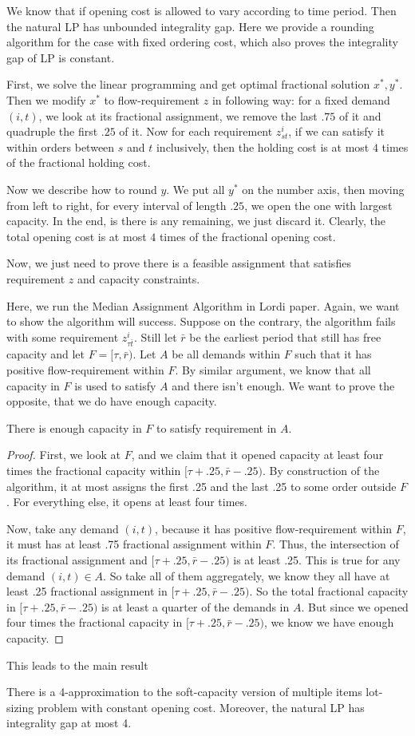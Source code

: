 We know that if opening cost is allowed to vary according
to time period. Then the natural LP has unbounded integrality
gap. Here we provide a rounding algorithm for the case
with fixed ordering cost, which also proves the integrality
gap of LP is constant.

First, we solve the linear programming and get optimal
fractional solution $x^*, y^*$. Then we modify $x^*$
to flow-requirement $z$ in following way:
for a fixed demand $(i,t)$, we look at its fractional
assignment, we remove the last $.75$ of it and quadruple
the first $.25$ of it. Now for each requirement $z_{st}^i$,
if we can satisfy it within orders between $s$ and $t$
inclusively, then the holding cost is at most $4$ times
of the fractional holding cost.

Now we describe how to round $y$. We put all $y^*$ on the number
axis, then moving from left to right, for every interval of
length $.25$, we open the one with largest capacity. In the end,
is there is any remaining, we just discard it. Clearly,
the total opening cost is at most $4$ times of the fractional
opening cost.

Now, we just need to prove there is a feasible assignment
that satisfies requirement $z$ and capacity constraints.

Here, we run the Median Assignment Algorithm in Lordi paper.
Again, we want to show the algorithm will success. Suppose
on the contrary, the algorithm fails with some requirement
$z^i_{\tau\bar t}$. Still let $\bar r$ be the earliest period that
still has free capacity and let $F = [\tau, \bar r)$. Let $A$
be all demands within $F$ such that it has positive flow-requirement
within $F$. By similar argument, we know that all capacity
in $F$ is used to satisfy $A$ and there isn't enough. We
want to prove the opposite, that we do have enough capacity.

\begin{claim}
There is enough capacity in $F$ to satisfy requirement in $A$.
\end{claim}

\begin{proof}
First, we look at $F$, and we claim that it opened capacity
at least four times the fractional capacity within $[\tau+.25,\bar r-.25)$.
By construction of the algorithm, it at most assigns the first .25 and the
last .25 to some order outside $F$. For everything else, it opens
at least four times.

Now, take any demand $(i,t)$, because it has positive
flow-requirement within $F$, it must has at least .75 fractional
assignment within $F$. Thus, the intersection of its fractional
assignment and $[\tau+.25,\bar r-.25)$ is at least .25. This
is true for any demand $(i,t) \in A$. So take all of them aggregately,
we know they all have at least .25 fractional assignment in $[\tau+.25,\bar r-.25)$.
So the total fractional capacity in $[\tau+.25,\bar r-.25)$ is at least a quarter
of the demands in $A$. But since we opened four times the fractional capacity
in $[\tau+.25,\bar r-.25)$, we know we have enough capacity.
\end{proof}

This leads to the main result

\begin{thm}
There is a 4-approximation to the soft-capacity version of multiple items lot-sizing
problem with constant opening cost. Moreover, the natural LP has integrality gap
at most 4.
\end{thm}